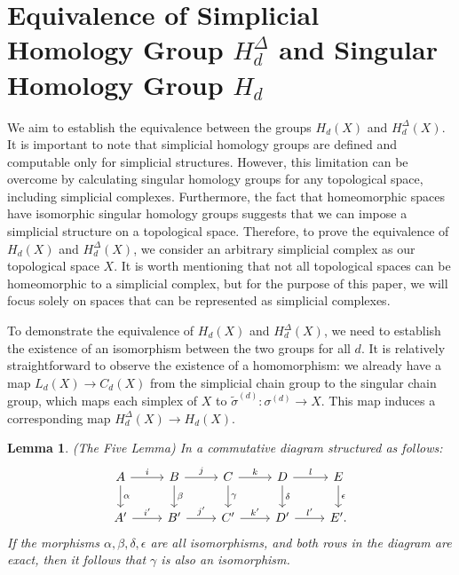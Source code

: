 \documentclass{amsart}
\newtheorem{lemma}[definition]{Lemma}
\begin{document}
\section{Equivalence of Simplicial Homology Group $H_d^\Delta$ and Singular Homology Group $H_d$}
We aim to establish the equivalence between the groups $H_d(X)$ and $H^\Delta_d(X)$. It is important to note that simplicial homology groups are defined and computable only for simplicial structures. However, this limitation can be overcome by calculating singular homology groups for any topological space, including simplicial complexes. Furthermore, the fact that homeomorphic spaces have isomorphic singular homology groups suggests that we can impose a simplicial structure on a topological space. Therefore, to prove the equivalence of $H_d(X)$ and $H^\Delta_d(X)$, we consider an arbitrary simplicial complex as our topological space $X$. It is worth mentioning that not all topological spaces can be homeomorphic to a simplicial complex, but for the purpose of this paper, we will focus solely on spaces that can be represented as simplicial complexes.

To demonstrate the equivalence of $H_d(X)$ and $H^\Delta_d(X)$, we need to establish the existence of an isomorphism between the two groups for all $d$. It is relatively straightforward to observe the existence of a homomorphism: we already have a map $L_d(X) \rightarrow C_d(X)$ from the simplicial chain group to the singular chain group, which maps each simplex of $X$ to $\tilde{\sigma}^{(d)}: \sigma^{(d)} \rightarrow X$. This map induces a corresponding map $H^\Delta_d(X) \rightarrow H_d(X)$.

\begin{lemma}{(The Five Lemma)}
\label{fivelemma}
In a commutative diagram structured as follows:
\begin{equation}
\begin{tikzcd}
A \arrow[r, "i"] \arrow[d, "\alpha"] & B \arrow[r, "j"] \arrow[d, "\beta"] & C \arrow[r, "k"] \arrow[d, "\gamma"] & D \arrow[r, "l"] \arrow[d, "\delta"] & E \arrow[d, "\epsilon"] \\
A' \arrow[r, "i'"]                               & B' \arrow[r, "j'"]                              & C' \arrow[r, "k'"]                               & D' \arrow[r, "l'"]                               & E'.                                 
\end{tikzcd}
\end{equation}
If the morphisms $\alpha, \beta, \delta, \epsilon$ are all isomorphisms, and both rows in the diagram are exact, then it follows that $\gamma$ is also an isomorphism.
\end{lemma}
\end{document}
